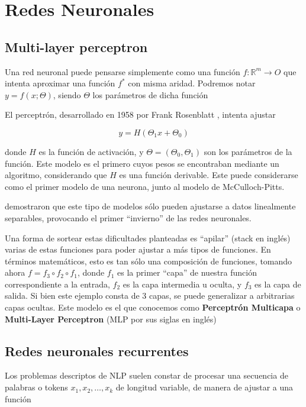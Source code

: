 \section{Redes Neuronales}

\subsection{Multi-layer perceptron}

Una red neuronal puede pensarse simplemente como una función $f: \mathbb{R}^m \rightarrow O$ que intenta aproximar una función $f^*$ con misma aridad. Podremos notar $ y = f(x; \Theta)$, siendo $\Theta$ los parámetros de dicha función

El perceptrón, desarrollado en 1958 por Frank Rosenblatt \cite{rosenblatt1958perceptron}, intenta ajustar

\begin{equation*}
    y = H(\Theta_1 x + \Theta_0)
\end{equation*}

donde $H$ es la función de activación, y $\Theta = (\Theta_0, \Theta_1)$ son los parámetros de la función. Este modelo es el primero cuyos pesos se encontraban mediante un algoritmo, considerando que $H$ es una función derivable. Este puede considerarse como el primer modelo de una neurona, junto al modelo de McCulloch-Pitts.

\citet{minsky1969perceptrons} demostraron que este tipo de modelos sólo pueden ajustarse a datos linealmente separables, provocando el primer ``invierno'' de las redes neuronales.

Una forma de sortear estas dificultades planteadas es ``apilar'' (stack en inglés) varias de estas funciones para poder ajustar a más tipos de funciones. En términos matemáticos, esto es tan sólo una composición de funciones, tomando ahora $f = f_3 \circ f_2 \circ f_1$, donde $f_1$ es la primer ``capa'' de nuestra función correspondiente a la entrada, $f_2$ es la capa intermedia u oculta, y $f_3$ es la capa de salida. Si bien este ejemplo consta de 3 capas, se puede generalizar a arbitrarias capas ocultas. Este modelo es el que conocemos como \textbf{Perceptrón Multicapa} o \textbf{Multi-Layer Perceptron} (MLP por sus siglas en inglés)

\subsection{Redes neuronales recurrentes}

Los problemas descriptos de NLP suelen constar de procesar una secuencia de palabras o tokens $x_1, x_2, \ldots, x_k$ de longitud variable, de manera de ajustar a una función

